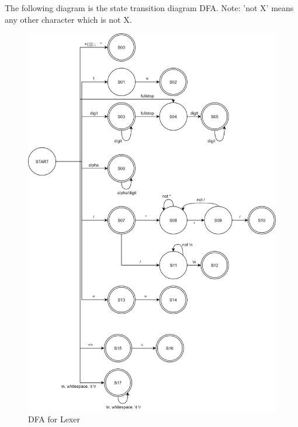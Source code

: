 The following diagram is the state transition diagram DFA. Note: 'not X' means any other character which is not X.
\begin{figure}[H]
	\centering
	\includegraphics[scale=0.22]{Images/Q1_StateTransitionDiagram.png}
	\caption{DFA for Lexer}
\end{figure}

